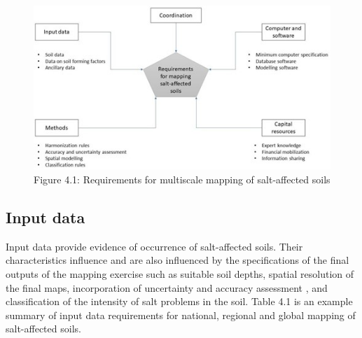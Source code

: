\documentclass[
  10pt,
  b5paper,
]{book}
\begin{document}
\begin{figure}
\centering
\includegraphics{figures/images/Figure4.1.jpg}
\caption{Figure 4.1: Requirements for multiscale mapping of salt-affected soils}
\end{figure}

\hypertarget{input-data}{%
\subsection{Input data}\label{input-data}}

Input data provide evidence of occurrence of salt-affected soils. Their characteristics influence and are also influenced by the specifications of the final outputs of the mapping exercise such as suitable soil depths, spatial resolution of the final maps, incorporation of uncertainty and accuracy assessment , and classification of the intensity of salt problems in the soil. Table 4.1 is an example summary of input data requirements for national, regional and global mapping of salt-affected soils.
\end{document}
